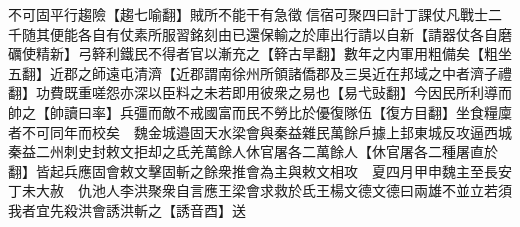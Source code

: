 不可固平行趨險【趨七喻翻】賊所不能干有急徵信宿可聚四曰計丁課仗凡戰士二千随其便能各自有仗素所服習銘刻由已還保輸之於庫出行請以自新【請器仗各自磨礪使精新】弓簳利鐵民不得者官以漸充之【簳古旱翻】數年之内軍用粗備矣【粗坐五翻】近郡之師遠屯清濟【近郡謂南徐州所領諸僑郡及三吳近在邦域之中者濟子禮翻】功費既重嗟怨亦深以臣料之未若即用彼衆之易也【易弋䜴翻】今因民所利導而帥之【帥讀曰率】兵彊而敵不戒國富而民不勞比於優復隊伍【復方目翻】坐食糧廩者不可同年而校矣　魏金城邉固天水梁會與秦益雜民萬餘戶據上邽東城反攻逼西城秦益二州刺史封敕文拒却之氐羌萬餘人休官屠各二萬餘人【休官屠各二種屠直於翻】皆起兵應固會敕文擊固斬之餘衆推會為主與敕文相攻　夏四月甲申魏主至長安　丁未大赦　仇池人李洪聚衆自言應王梁會求救於氐王楊文德文德曰兩雄不並立若須我者宜先殺洪會誘洪斬之【誘音酉】送